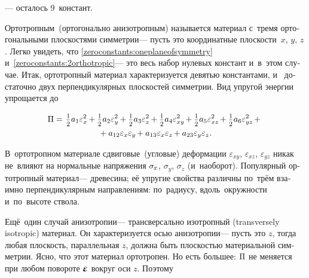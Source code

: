 \begin{otherlanguage}{russian}
\vspace{-0.25em}\noindent
--- осталось 9~констант.

Ортотропным~(ортогонально анизотропным) называется материал с~тремя ортогональными плоскостями симметрии\:--- пусть это координатные плоскости~$x$, $y$, $z$.
Легко увидеть, что \eqref{zeroconstants:oneplaneofsymmetry} и~\eqref{zeroconstants:2orthotropic}\:--- это весь набор нулевых констант и~в~этом случае.
Итак, ортотропный материал характеризуется девятью константами, и~ достаточно двух перпендикулярных плоскостей симметрии.
Вид упругой энергии упрощается до

\nopagebreak\vspace{-0.25em}\begin{multline*}
\potential =^{\mathstrut^{\mathstrut}} \smalldisplaystyleonehalf a_1 \varepsilon^2_{x} \hspace{-0.1ex} + \smalldisplaystyleonehalf a_2 \varepsilon^2_{y} \hspace{-0.1ex} + \smalldisplaystyleonehalf a_3 \varepsilon^2_{z} \hspace{-0.1ex} + \smalldisplaystyleonehalf a_4 \varepsilon^2_{xy} \hspace{-0.2ex} + \smalldisplaystyleonehalf a_5 \varepsilon^2_{xz} \hspace{-0.2ex} + \smalldisplaystyleonehalf a_6 \varepsilon^2_{yz} \hspace{-0.2ex} +{}
\\[-0.1em]
%
{}+ a_{12} \varepsilon_{x} \varepsilon_{y} \hspace{-0.2ex} + a_{13} \varepsilon_{x} \varepsilon_{z} \hspace{-0.2ex} + a_{23} \varepsilon_{y} \varepsilon_{z}
\hspace{.1ex} .
\end{multline*}

В~ортотропном материале сдвиговые~(угловые) деформации ${\varepsilon_{xy}}$, ${\varepsilon_{xz}}$, ${\varepsilon_{yz}}$ никак не~влияют на нормальные напряжения ${\sigma_{\hspace{-.1ex}x}}$\hspace{-.1ex}, ${\sigma_y}$\hspace{-.1ex}, ${\sigma_z}$ (и~наоборот).
Популярный ортотропный материал\:--- древесина; её упругие свойства различны по~трём взаимно перпендикулярным направлениям: по~радиусу, вдоль~окружности и~по~высоте ствола.

Ещё~один случай анизотропии\:--- трансверсально изотропный (transversely isotropic) материал.
Он характеризуется осью анизотропии\:--- пусть это $z$, тогда любая плоскость, параллельная $z$, должна быть плоскостью материальной симметрии.
Ясно, что этот материал ортотропен.
Но есть большее: $\Pi$ не меняется при любом повороте $\infinitesimaldeformation$ вокруг оси $z$.
Поэтому


\end{otherlanguage}
